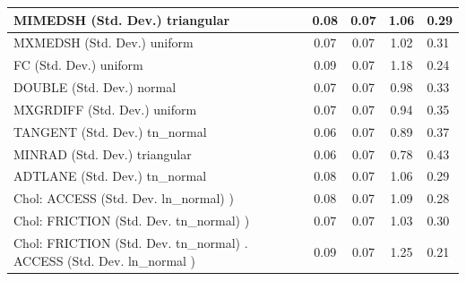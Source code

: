 \begin{table}
\begin{center}
\begin{tabular}{|l|l|c|c|c|l|}
			\hline
			MIMEDSH (Std. Dev.) triangular &  & 0.08 & 0.07 & 1.06 & 0.29 \\
			\hline
			MXMEDSH (Std. Dev.) uniform &  & 0.07 & 0.07 & 1.02 & 0.31 \\
			\hline
			FC (Std. Dev.) uniform &  & 0.09 & 0.07 & 1.18 & 0.24 \\
			\hline
			DOUBLE (Std. Dev.) normal &  & 0.07 & 0.07 & 0.98 & 0.33 \\
			\hline
			MXGRDIFF (Std. Dev.) uniform &  & 0.07 & 0.07 & 0.94 & 0.35 \\
			\hline
			TANGENT (Std. Dev.) tn_normal &  & 0.06 & 0.07 & 0.89 & 0.37 \\
			\hline
			MINRAD (Std. Dev.) triangular &  & 0.06 & 0.07 & 0.78 & 0.43 \\
			\hline
			ADTLANE (Std. Dev.) tn_normal &  & 0.08 & 0.07 & 1.06 & 0.29 \\
			\hline
			 Chol: ACCESS (Std. Dev. ln_normal) ) &  & 0.08 & 0.07 & 1.09 & 0.28 \\
			\hline
			 Chol: FRICTION (Std. Dev. tn_normal) ) &  & 0.07 & 0.07 & 1.03 & 0.30 \\
			\hline
			 Chol: FRICTION (Std. Dev. tn_normal) . ACCESS (Std. Dev.   ln_normal ) &  & 0.09 & 0.07 & 1.25 & 0.21 \\
			\hline
		\end{tabular}
	\end{center}
\end{table}